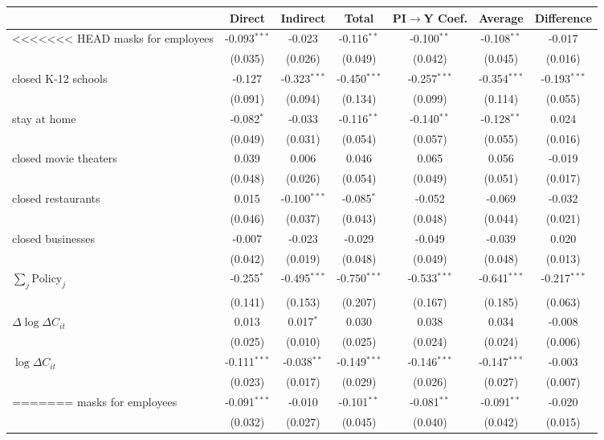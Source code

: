 
\begin{tabular}{lccccc|>{}c}
\toprule
  & Direct & Indirect & Total & PI$\to$Y Coef. & Average & Difference\\
\midrule
<<<<<<< HEAD
masks for employees & -0.093$^{***}$ & -0.023 & -0.116$^{**}$ & -0.100$^{**}$ & -0.108$^{**}$ & -0.017\\
 & (0.035) & (0.026) & (0.049) & (0.042) & (0.045) & (0.016)\\
closed K-12 schools & -0.127 & -0.323$^{***}$ & -0.450$^{***}$ & -0.257$^{***}$ & -0.354$^{***}$ & -0.193$^{***}$\\
 & (0.091) & (0.094) & (0.134) & (0.099) & (0.114) & (0.055)\\
stay at home & -0.082$^{*}$ & -0.033 & -0.116$^{**}$ & -0.140$^{**}$ & -0.128$^{**}$ & 0.024\\
 & (0.049) & (0.031) & (0.054) & (0.057) & (0.055) & (0.016)\\
closed movie theaters & 0.039 & 0.006 & 0.046 & 0.065 & 0.056 & -0.019\\
 & (0.048) & (0.026) & (0.054) & (0.049) & (0.051) & (0.017)\\
closed restaurants & 0.015 & -0.100$^{***}$ & -0.085$^{*}$ & -0.052 & -0.069 & -0.032\\
 & (0.046) & (0.037) & (0.043) & (0.048) & (0.044) & (0.021)\\
closed businesses & -0.007 & -0.023 & -0.029 & -0.049 & -0.039 & 0.020\\
 & (0.042) & (0.019) & (0.048) & (0.049) & (0.048) & (0.013)\\
$\sum_j \mathrm{Policy}_j$ & -0.255$^{*}$ & -0.495$^{***}$ & -0.750$^{***}$ & -0.533$^{***}$ & -0.641$^{***}$ & -0.217$^{***}$\\
 & (0.141) & (0.153) & (0.207) & (0.167) & (0.185) & (0.063)\\
$\Delta \log \Delta C_{it}$ & 0.013 & 0.017$^{*}$ & 0.030 & 0.038 & 0.034 & -0.008\\
 & (0.025) & (0.010) & (0.025) & (0.024) & (0.024) & (0.006)\\
$\log \Delta C_{it}$ & -0.111$^{***}$ & -0.038$^{**}$ & -0.149$^{***}$ & -0.146$^{***}$ & -0.147$^{***}$ & -0.003\\
 & (0.023) & (0.017) & (0.029) & (0.026) & (0.027) & (0.007)\\
=======
masks for employees & -0.091$^{***}$ & -0.010 & -0.101$^{**}$ & -0.081$^{**}$ & -0.091$^{**}$ & -0.020\\
 & (0.032) & (0.027) & (0.045) & (0.040) & (0.042) & (0.015)\\

\end{tabular}
